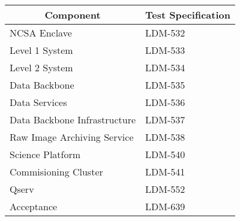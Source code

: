 \begin{longtable}{p{}|p{}}
\multicolumn{1}{c}{\textbf{Component}} & \multicolumn{1}{c}{\textbf{Test Specification}} \\ \hline

\rowcolor{yellow!50!white} NCSA Enclave &                 LDM-532 \\ \hline
\rowcolor{cyan!50!white}   Level 1 System   &             LDM-533 \\ \hline
\rowcolor{cyan!50!white}   Level 2 System   &             LDM-534 \\ \hline
\rowcolor{yellow!50!white} Data Backbone &                LDM-535 \\ \hline
\rowcolor{yellow!50!white} Data Services &                LDM-536 \\ \hline
\rowcolor{cyan!50!white}   Data Backbone Infrastructure & LDM-537 \\ \hline
\rowcolor{cyan!50!white}   Raw Image Archiving Service &  LDM-538 \\ \hline
\rowcolor{cyan!50!white}   Science Platform &             LDM-540 \\ \hline
\rowcolor{yellow!50!white} Commisioning Cluster &         LDM-541 \\ \hline
\rowcolor{cyan!50!white}   Qserv &                        LDM-552 \\ \hline
\rowcolor{orange!50!white} \product{} Acceptance &        LDM-639 \\ \hline

\end{longtable}
